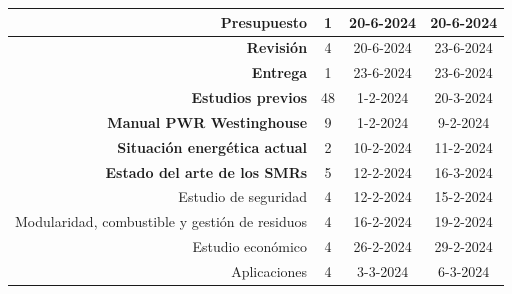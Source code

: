 \begin{table}[!h]
\begin{tabular}{|r|c|c|c|}
    \rowcolor[HTML]{CBE5CB} 
    \textbf{Presupuesto}                                         & 1                         & 20-6-2024                         & 20-6-2024                         \\ \hline
    \rowcolor[HTML]{CBE5CB} 
    \textbf{Revisión}                                            & 4                         & 20-6-2024                         & 23-6-2024                         \\ \hline
    \rowcolor[HTML]{CBE5CB} 
    \textbf{Entrega}                                             & 1                         & 23-6-2024                         & 23-6-2024                         \\ \hline
    \rowcolor[HTML]{FFCE93} 
    \textbf{Estudios previos}                                    & 48                        & 1-2-2024                          & 20-3-2024                         \\ \hline
    \rowcolor[HTML]{CBE5CB} 
    \cellcolor[HTML]{CBE5CB}\textbf{Manual PWR Westinghouse}     & 9                         & 1-2-2024                          & 9-2-2024                          \\ \hline
    \rowcolor[HTML]{CBE5CB} 
    \textbf{Situación energética actual}                         & 2                         & 10-2-2024                         & 11-2-2024                         \\ \hline
    \rowcolor[HTML]{CBE5CB} 
    \textbf{Estado del arte de los SMRs}                         & 5                         & 12-2-2024                         & 16-3-2024                         \\ \hline
    \rowcolor[HTML]{ECF4FF} 
    Estudio de seguridad                                         & 4                         & 12-2-2024                         & 15-2-2024                         \\ \hline
    \rowcolor[HTML]{ECF4FF} 
    Modularidad, combustible y gestión de residuos               & 4                         & 16-2-2024                         & 19-2-2024                         \\ \hline
    \rowcolor[HTML]{ECF4FF} 
    Estudio económico                                            & 4                         & 26-2-2024                         & 29-2-2024                         \\ \hline
    \rowcolor[HTML]{ECF4FF} 
    Aplicaciones                                                 & 4                         & 3-3-2024                          & 6-3-2024                          \\ \hline

\end{tabular}
\end{table}
